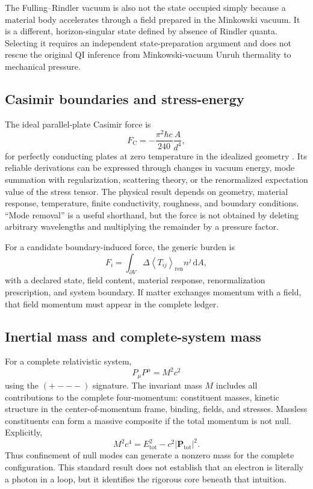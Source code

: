 \documentclass[11pt]{article}
\newcommand{\dd}{\mathrm{d}}
\newcommand{\abs}[1]{\left\lvert #1\right\rvert}
\newcommand{\avg}[1]{\left\langle #1\right\rangle}
\begin{document}
The Fulling--Rindler vacuum is also not the state occupied simply because a material body accelerates through a field prepared in the Minkowski vacuum. It is a different, horizon-singular state defined by absence of Rindler quanta. Selecting it requires an independent state-preparation argument and does not rescue the original QI inference from Minkowski-vacuum Unruh thermality to mechanical pressure.

\subsection{Casimir boundaries and stress-energy}

The ideal parallel-plate Casimir force is
\begin{equation}
    F_{\mathrm C}=-\frac{\pi^{2}\hbar c}{240}\frac{A}{d^{4}},
    \label{eq:casimir}
\end{equation}
for perfectly conducting plates at zero temperature in the idealized geometry \cite{Casimir1948,BrownMaclay1969,Milton2001}. Its reliable derivations can be expressed through changes in vacuum energy, mode summation with regularization, scattering theory, or the renormalized expectation value of the stress tensor. The physical result depends on geometry, material response, temperature, finite conductivity, roughness, and boundary conditions. ``Mode removal'' is a useful shorthand, but the force is not obtained by deleting arbitrary wavelengths and multiplying the remainder by a pressure factor.

For a candidate boundary-induced force, the generic burden is
\begin{equation}
    F_i
    =\int_{\partial V}
    \Delta\avg{T_{ij}}_{\mathrm{ren}}n^{j}\,\dd A,
    \label{eq:stress_force}
\end{equation}
with a declared state, field content, material response, renormalization prescription, and system boundary. If matter exchanges momentum with a field, that field momentum must appear in the complete ledger.

\subsection{Inertial mass and complete-system mass}

For a complete relativistic system,
\begin{equation}
    P_{\mu}P^{\mu}=M^{2}c^{2}
    \label{eq:mass_casimir}
\end{equation}
using the \((+---)\) signature. The invariant mass \(M\) includes all contributions to the complete four-momentum: constituent masses, kinetic structure in the center-of-momentum frame, binding, fields, and stresses. Massless constituents can form a massive composite if the total momentum is not null. Explicitly,
\begin{equation}
    M^{2}c^{4}=E_{\mathrm{tot}}^{2}-c^{2}\abs{\mathbf P_{\mathrm{tot}}}^{2}.
    \label{eq:composite_mass}
\end{equation}
Thus confinement of null modes can generate a nonzero mass for the complete configuration. This standard result does not establish that an electron is literally a photon in a loop, but it identifies the rigorous core beneath that intuition.
\end{document}
